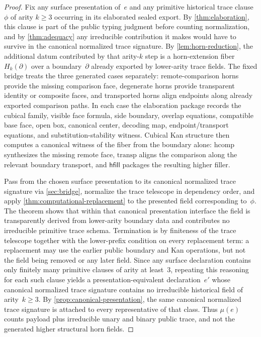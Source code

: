 \documentclass{lmcs}
\newcommand{\hcomp}{\mathrm{hcomp}}
\newcommand{\transp}{\mathrm{transp}}
\begin{document}
\begin{proof}
Fix any surface presentation of~$e$ and any primitive historical trace clause~$\phi$ of arity $k \geq 3$ occurring in its elaborated sealed export. By \autoref{thm:elaboration}, this clause is part of the public typing judgment before counting normalization, and by \autoref{thm:adequacy} any irreducible contribution it makes would have to survive in the canonical normalized trace signature. By \autoref{lem:horn-reduction}, the additional datum contributed by that arity-$k$ step is a horn-extension fiber $H_k(\partial)$ over a boundary~$\partial$ already exported by lower-arity trace fields. The fixed bridge treats the three generated cases separately: remote-comparison horns provide the missing comparison face, degenerate horns provide transparent identity or composite faces, and transported horns align endpoints along already exported comparison paths. In each case the elaboration package records the cubical family, visible face formula, side boundary, overlap equations, compatible base face, open box, canonical center, decoding map, endpoint/transport equations, and substitution-stability witness. Cubical Kan structure then computes a canonical witness of the fiber from the boundary alone: $\hcomp$ synthesizes the missing remote face, $\transp$ aligns the comparison along the relevant boundary transport, and $\mathsf{hfill}$ packages the resulting higher filler.

Pass from the chosen surface presentation to its canonical normalized trace signature via \autoref{sec:bridge}, normalize the trace telescope in dependency order, and apply \autoref{thm:computational-replacement} to the presented field corresponding to~$\phi$. The theorem shows that within that canonical presentation interface the field is transparently derived from lower-arity boundary data and contributes no irreducible primitive trace schema. Termination is by finiteness of the trace telescope together with the lower-prefix condition on every replacement term: a replacement may use the earlier public boundary and Kan operations, but not the field being removed or any later field. Since any surface declaration contains only finitely many primitive clauses of arity at least~$3$, repeating this reasoning for each such clause yields a presentation-equivalent declaration~$e'$ whose canonical normalized trace signature contains no irreducible historical field of arity~$k \geq 3$. By \autoref{prop:canonical-presentation}, the same canonical normalized trace signature is attached to every representative of that class. Thus $\mu(e)$ counts payload plus irreducible unary and binary public trace, and not the generated higher structural horn fields.
\end{proof}
\end{document}
